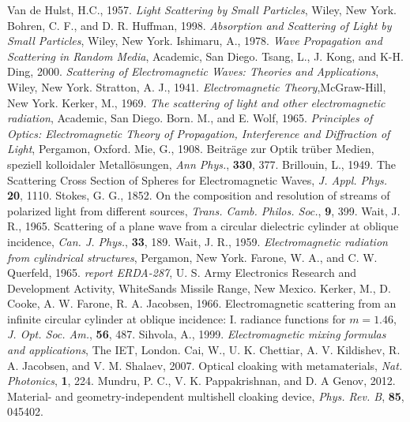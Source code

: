 \begin{thebibliography}{99}
\setlength{\itemsep}{0.3in}
Van de Hulst, H.C., 1957. \textit{Light Scattering by Small Particles}, Wiley, New York.
Bohren, C. F., and D. R. Huffman, 1998. \textit{Absorption and Scattering of Light by Small Particles}, Wiley, New York.
Ishimaru, A., 1978. \textit{Wave Propagation and Scattering in Random Media}, Academic, San Diego.
Tsang, L., J. Kong, and K-H. Ding, 2000. \textit{Scattering of Electromagnetic Waves: Theories and Applications}, Wiley, New York.
Stratton, A. J., 1941. \textit{Electromagnetic Theory},McGraw-Hill, New York.
Kerker, M., 1969. \textit{The scattering of light and other electromagnetic radiation}, Academic, San Diego.
Born. M., and E. Wolf, 1965. \textit{Principles of Optics: Electromagnetic Theory of Propagation, Interference and Diffraction of Light}, Pergamon, Oxford.
Mie, G., 1908. Beitr{\"a}ge zur Optik tr{\"u}ber Medien, speziell kolloidaler Metall{\"o}sungen, \textit{Ann Phys.}, \textbf{330}, 377.
 Brillouin, L., 1949. The Scattering Cross Section of Spheres for Electromagnetic Waves, \textit{J. Appl. Phys.} \textbf{20}, 1110.
Stokes, G. G., 1852. On the composition and resolution of streams of polarized light from different sources, \textit{Trans. Camb. Philos. Soc.}, \textbf{9}, 399.
Wait, J. R., 1965. Scattering of a plane wave from a circular dielectric cylinder at oblique incidence,  \textit{Can. J. Phys.}, \textbf{33}, 189.
Wait, J. R., 1959. \textit{Electromagnetic radiation from cylindrical structures}, Pergamon, New York.
Farone, W. A., and C. W. Querfeld, 1965. \textit{report ERDA-287}, U. S. Army Electronics Research and Development Activity, WhiteSands Missile Range, New Mexico.
Kerker, M., D. Cooke, A. W. Farone, R. A. Jacobsen, 1966. Electromagnetic scattering from an infinite circular cylinder at oblique incidence: I. radiance functions for \(m = 1.46\),
\textit{J. Opt. Soc. Am.}, \textbf{56}, 487.
Sihvola, A., 1999. \textit{Electromagnetic mixing formulas and applications}, The IET, London.
Cai, W., U. K. Chettiar, A. V. Kildishev, R. A. Jacobsen, and V. M. Shalaev, 2007. Optical cloaking with metamaterials,
\textit{Nat. Photonics}, \textbf{1}, 224.
Mundru, P. C., V. K. Pappakrishnan, and D. A Genov, 2012. Material- and geometry-independent multishell cloaking device, \textit{Phys. Rev. B}, \textbf{85}, 045402.

\end{thebibliography}
